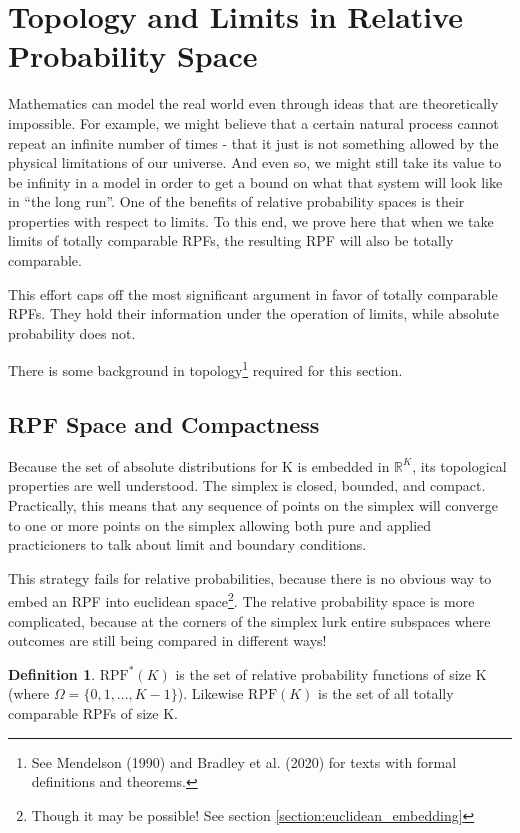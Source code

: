 \documentclass[twoside]{article}
\newcommand{\quotes}[1]{``#1''}
\theoremstyle{plain}%
\theoremstyle{definition}
\newtheorem{definition}{Definition}[section]
\theoremstyle{remark}
\begin{document}
\section{Topology and Limits in Relative Probability Space}
\label{section:topology}

Mathematics can model the real world even through ideas that are theoretically impossible. For example, we might believe that a certain natural process cannot repeat an infinite number of times - that it just is not something allowed by the physical limitations of our universe. And even so, we might still take its value to be infinity in a model in order to get a bound on what that system will look like in \quotes{the long run}. One of the benefits of relative probability spaces is their properties with respect to limits. To this end, we prove here that when we take limits of totally comparable RPFs, the resulting RPF will also be totally comparable.

This effort caps off the most significant argument in favor of totally comparable RPFs. They hold their information under the operation of limits, while absolute probability does not.

There is some background in topology\footnote{See Mendelson (1990) \cite{mendelson} and Bradley et al. (2020) \cite{bradley} for texts with formal definitions and theorems.} required for this section.

\subsection{RPF Space and Compactness}

Because the set of absolute distributions for K is embedded in \(\mathbb{R}^K\), its topological properties are well understood. The simplex is closed, bounded, and compact. Practically, this means that any sequence of points on the simplex will converge to one or more points on the simplex allowing both pure and applied practicioners to talk about limit and boundary conditions.

This strategy fails for relative probabilities, because there is no obvious way to embed an RPF into euclidean space\footnote{Though it may be possible! See section \ref{section:euclidean_embedding}}. The relative probability space is more complicated, because at the corners of the simplex lurk entire subspaces where outcomes are still being compared in different ways!

\begin{definition}
\(\text{RPF}^{\ast}(K)\) is the set of relative probability functions of size K (where \(\Omega = \{0, 1, ..., K - 1\}\)). Likewise \(\text{RPF}(K)\) is the set of all totally comparable RPFs of size K.
\end{definition}
\end{document}
